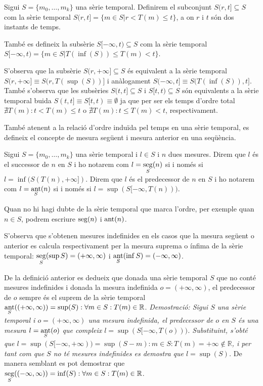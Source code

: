 \begin{definition}[Interval]
  Sigui $S=\{m_0, \ldots, m_k\}$ una sèrie temporal. Definirem el subconjunt
  $S(r,t] \subseteq S$ com la sèrie temporal $S(r,t]=\{m\in S
  | r<T(m)\leq t\}$, a on $r$ i $t$ són dos instants de temps.

  També es defineix la subsèrie $S[-\infty,t)\subseteq S$ com la sèrie
  temporal $S[-\infty,t) = \{m\in S | T(\inf(S))\leq T(m) < t\}$.
\end{definition}
S'observa que la subsèrie $S(r,+\infty]\subseteq S$ és
equivalent a la sèrie temporal $S(r,+\infty] \equiv S(r,T(\sup(S))]$ i
anàlogament $S(-\infty,t] \equiv S(T(\inf(S)),t]$. També s'observa que les subsèries $S(t,t]\subseteq S$ i $S[t,t)\subseteq S$ són equivalents a la sèrie temporal buida $S(t,t] \equiv S[t,t) \equiv \emptyset$ ja que per ser els temps d'ordre total $\nexists T(m): t < T(m) \leq t$ o $\nexists T(m): t \leq T(m) < t$, respectivament. 
 
També atenent a la relació d'ordre induïda pel temps en una sèrie temporal, es
defineix el concepte de mesura següent i mesura anterior en una
seqüència.

\begin{definition}
  Sigui $S=\{m_0, \ldots, m_k\}$ una sèrie temporal i $l\in S$ i $n$ dues
  mesures. Direm que $l$ és el successor de $n$ en $S$ i ho notarem
  com $l=\operatorname*{seg}\limits_S(n)$ si i només si $l=\inf(S(T(n),+\infty])$.
  Direm que $l$ és el predecessor de $n$ en $S$ i ho notarem com
  $l=\operatorname*{ant}\limits_S(n)$ si i només si $l=\sup(S[-\infty,T(n)))$.

Quan no hi hagi dubte de la sèrie temporal que marca l'ordre, per
exemple quan $n\in S$, podrem escriure $\operatorname*{seg}(n)$ i $\operatorname*{ant}(n)$.
\end{definition}
S'observa que s'obtenen mesures indefinides en els casos que la
mesura següent o anterior es calcula respectivament per la mesura
suprema o ínfima de la sèrie temporal: $\operatorname*{seg}\limits_S(\sup
S)=(+\infty,\infty)$ i $\operatorname*{ant}\limits_S(\inf S)=(-\infty,\infty)$.

De la definició anterior es dedueix que donada una sèrie temporal $S$
que no conté mesures indefinides i donada la mesura indefinida
$o=(+\infty,\infty)$, el predecessor de $o$ sempre és el suprem de la
sèrie temporal $\operatorname*{ant}\limits_S( (+\infty,\infty) ) = \sup(S): \forall
m\in S: T(m)\in\mathbb{R}$.  %
\emph{Demostració: Sigui $S$ una sèrie temporal i $o=(+\infty,\infty)$
  una mesura indefinida, el predecessor de $o$ en $S$ és una mesura
  $l=\operatorname*{ant}\limits_S(o)$ que compleix
  $l=\sup(S[-\infty,T(o)))$. Substituint, s'obté que
  $l=\sup(S[-\infty,+\infty))=\sup(S-m):m\in S:T(m)=+\infty \notin
  \mathbb{R}$, i per tant com que $S$ no té mesures indefinides es
  demostra que $l=\sup(S)$.  } De manera semblant es pot demostrar que
$\operatorname*{seg}\limits_S( (-\infty,\infty) ) = \inf(S): \forall m\in S:
T(m)\in\mathbb{R}$.




